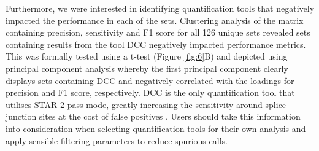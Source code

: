 \begin{table}[t!]
\caption[Top quantification tool combinations]{Top 10 performing quantification tool combinations at the lowest computational cost in the simulated dataset, ranked by F1 score.}
\centering
\footnotesize
{}
\label{table:topcombinations}
\end{table}

Furthermore, we were interested in identifying quantification tools that negatively impacted the performance in each of the sets. Clustering analysis of the matrix containing precision, sensitivity and F1 score for all 126 unique sets revealed sets containing results from the tool DCC negatively impacted performance metrics. This was formally tested using a t-test (Figure \ref{fig:6}B) and depicted using principal component analysis whereby the first principal component clearly displays sets containing DCC and negatively correlated with the loadings for precision and F1 score, respectively. DCC is the only quantification tool that utilises STAR 2-pass mode, greatly increasing the sensitivity around splice junction sites at the cost of false positives \cite{Engstrom2013Dec}. Users should take this information into consideration when selecting quantification tools for their own analysis and apply sensible filtering parameters to reduce spurious calls. 


